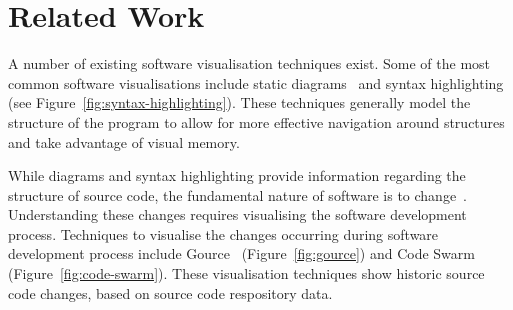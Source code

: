 \section{Related Work}

A number of existing software visualisation techniques exist. Some of the most common software visualisations include static diagrams~ and syntax highlighting (see Figure~\ref{fig:syntax-highlighting}). These techniques generally model the structure of the program to allow for more effective navigation around structures and take advantage of visual memory.

While diagrams and syntax highlighting provide information regarding the structure of source code, the fundamental nature of software is to change~. Understanding these changes requires visualising the software development process. Techniques to visualise the changes occurring during software development process include Gource~\cite{Caudwell2010} (Figure~\ref{fig:gource}) and Code Swarm~\cite{Ogawa2012} (Figure~\ref{fig:code-swarm}). These visualisation techniques show historic source code changes, based on source code respository data.

